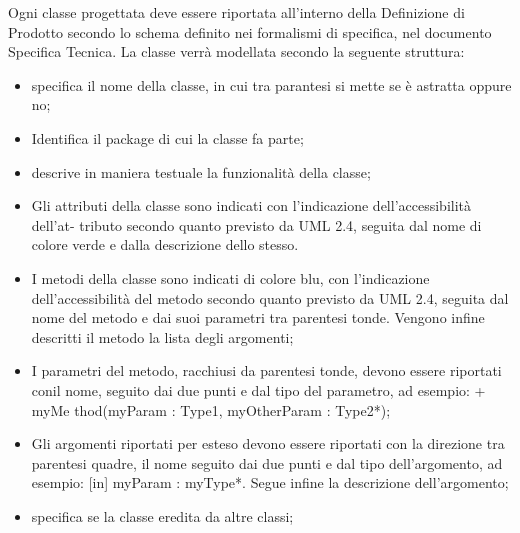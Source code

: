 Ogni classe progettata deve essere riportata all'interno della Definizione di Prodotto secondo lo schema definito nei formalismi di specifica, nel documento Specifica Tecnica. La classe verrà modellata secondo la seguente struttura:

\begin{itemize}
\item {}specifica il nome della classe, in cui tra parantesi si mette se è astratta oppure no;
\item {} Identifica il package di cui la classe fa parte;
\item {}descrive in maniera testuale la funzionalità della classe;
\item {}Gli attributi della classe sono indicati con l’indicazione dell’accessibilità dell’at-
tributo secondo quanto previsto da UML 2.4, seguita dal nome di colore verde e
dalla descrizione dello stesso.
\item {}I metodi della classe sono indicati di colore blu, con l’indicazione dell’accessibilità
del metodo secondo quanto previsto da UML 2.4, seguita dal nome del metodo e
dai suoi parametri tra parentesi tonde.
Vengono infine descritti il metodo  la lista degli argomenti;
\item {} I parametri del metodo, racchiusi da parentesi tonde, devono essere riportati conil nome, seguito dai due punti e dal tipo del parametro, ad esempio: + myMe
thod(myParam : Type1, myOtherParam : Type2*);
\item {}Gli argomenti riportati per esteso devono essere riportati con la direzione tra
parentesi quadre, il nome seguito dai due punti e dal tipo dell’argomento, ad
esempio: [in] myParam : myType*. Segue infine la descrizione dell’argomento;

\item {}specifica se la classe eredita da altre classi;
\end{itemize}

